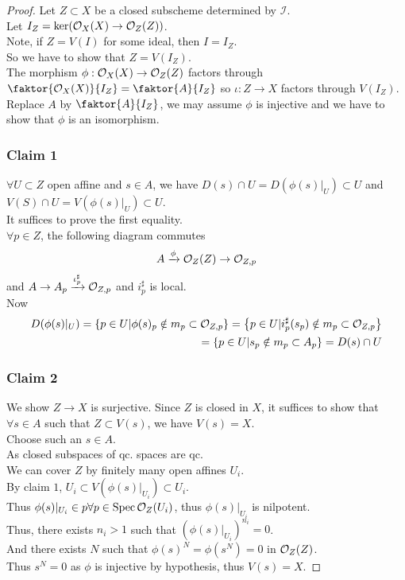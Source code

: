 \documentclass[../main.tex]{subfiles}
\begin{document}
\begin{proof}
Let $Z \subset X$ be a closed subscheme determined by $ \mathcal{I}$.\\
Let $I_Z = \ker ( \mathcal{O}_X( X) \to \mathcal{O}_Z( Z) ) $.\\
Note, if $Z=V( I)$ for some ideal, then $I = I_Z$.\\
So we have to show that $Z= V( I_Z) $.\\
The morphism $\phi: \mathcal{O}_X( X) \to \mathcal{O}_Z( Z) $ factors through $ \faktor{\O_X( X) }{I_Z}= \faktor{A}{I_Z}$	so $\iota: Z \to X$ factors through $V( I_Z) $.\\
Replace $A$ by $ \faktor{A}{I_Z}$, we may assume $\phi$  is injective and we have to show that $\phi$ is an isomorphism. 
\subsubsection*{Claim 1}
$\forall U \subset Z$ open affine and $s\in A$, we have $D( s) \cap U = D( \phi( s) |_U) \subset U$ and $V( S) \cap U= V( \phi( s) |_U) \subset U$.\\
It suffices to prove the first equality.\\
$\forall p \in Z$, the following diagram commutes
\[ 
	A\xrightarrow{\phi} \mathcal{O}_Z( Z) \to \mathcal{O}_{Z,p} 
\]
and $A \to A_p \xrightarrow{\iota_p^{\sharp}} \mathcal{O}_{Z,p} $ and $i^{\sharp}_p$ is local.\\
Now
\begin{align*}
D( \phi( s) |_U) = \left\{ p \in U | \phi( s)_p \notin m_p \subset \mathcal{O}_{Z,p}  \right\} = \left\{ p\in U|i_p^{\sharp}( s_p) \notin m_p \subset \mathcal{O}_{Z,p}  \right\} \\
= \left\{ p\in U | s_p \notin m_p \subset A_p \right\} = D( s) \cap U
\end{align*}
\subsubsection*{Claim 2}
We show $Z \to X$ is surjective.
Since $Z$ is closed in $X$, it suffices to show that $\forall s \in A$ such that $Z \subset V( s) $, we have $V( s) = X$.\\
Choose such an $s\in A$.\\
As closed subspaces of qc. spaces are qc.\\
We can cover $Z$ by finitely many open affines $U_i$.\\
By claim $1$, $U_i \subset V( \phi( s) |_{U_i} ) \subset U_i$.\\
Thus $\phi( s) |_{U_i} \in p\forall p \in \operatorname{Spec} \mathcal{O}_Z( U_i) $, thus $\phi( s) |_{U_i} $ is nilpotent.\\
Thus, there exists $n_i>1$ such that $( \phi( s) |_{U_i} )^{n_i}= 0$.\\
And there exists $N$ such that $\phi( s)^{N}= \phi( s^{N}) =0$ in $\mathcal{O}_Z( Z) $.\\
Thus $s^{N}=0$ as $\phi$ is injective by hypothesis, thus $V( s) = X$.

\end{proof}
\end{document}
